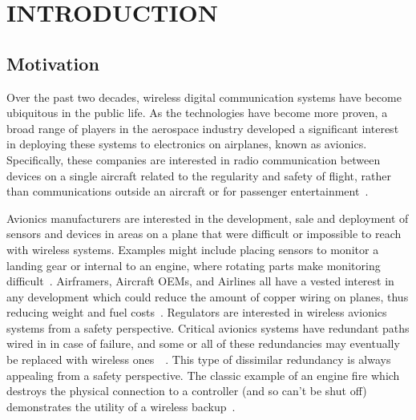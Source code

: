 %
%
%
%



\pagestyle{plain} %
\setcounter{page}{1}


\chapter{\uppercase {Introduction}}


\section{Motivation}

Over the past two decades, wireless digital communication systems have become ubiquitous in the public life. As the technologies have become more proven, a broad range of players in the aerospace industry developed a significant interest in deploying these systems to electronics on airplanes, known as avionics. Specifically, these companies are interested in radio communication between devices on a single aircraft related to the regularity and safety of flight, rather than communications outside an aircraft or for passenger entertainment~\cite{redman_waic_2011}. 

Avionics manufacturers are interested in the development, sale and deployment of sensors and devices in areas on a plane that were difficult or impossible to reach with wireless systems.  Examples might include placing sensors to monitor a landing gear or internal to an engine, where rotating parts make monitoring difficult~\cite{redman_waic_2011}. Airframers, Aircraft OEMs, and Airlines all have a vested interest in any development which could reduce the amount of copper wiring on planes, thus reducing weight and fuel costs~\cite{canaday_war_2017}. Regulators are interested in wireless avionics systems from a safety perspective. Critical avionics systems have redundant paths wired in in case of failure, and some or all of these redundancies may eventually be replaced  with wireless ones~\cite{canaday_war_2017}~\cite{redman_waic_2011}. This type of dissimilar redundancy is always appealing from a safety perspective. The classic example of an engine fire which destroys the physical connection to a controller (and so can't be shut off) demonstrates the utility of a wireless backup~\cite{redman_waic_2011}.

